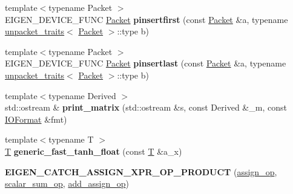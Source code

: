 \begin{DoxyCompactItemize}
\item 
\mbox{\label{namespace_eigen_1_1internal_aebd31b046fae40c8d457545c4f83875e}} 
{\footnotesize template$<$typename Packet $>$ }\\E\+I\+G\+E\+N\+\_\+\+D\+E\+V\+I\+C\+E\+\_\+\+F\+U\+NC \hyperlink{union_eigen_1_1internal_1_1_packet}{Packet} {\bfseries pinsertfirst} (const \hyperlink{union_eigen_1_1internal_1_1_packet}{Packet} \&a, typename \hyperlink{struct_eigen_1_1internal_1_1unpacket__traits}{unpacket\+\_\+traits}$<$ \hyperlink{union_eigen_1_1internal_1_1_packet}{Packet} $>$\+::type b)
\item 
\mbox{\label{namespace_eigen_1_1internal_a9925e0fa1f686d4304a8dcd1c3cc015a}} 
{\footnotesize template$<$typename Packet $>$ }\\E\+I\+G\+E\+N\+\_\+\+D\+E\+V\+I\+C\+E\+\_\+\+F\+U\+NC \hyperlink{union_eigen_1_1internal_1_1_packet}{Packet} {\bfseries pinsertlast} (const \hyperlink{union_eigen_1_1internal_1_1_packet}{Packet} \&a, typename \hyperlink{struct_eigen_1_1internal_1_1unpacket__traits}{unpacket\+\_\+traits}$<$ \hyperlink{union_eigen_1_1internal_1_1_packet}{Packet} $>$\+::type b)
\item 
\mbox{\label{namespace_eigen_1_1internal_ab2f70c62aa6708bda65f2ce9d49929e0}} 
{\footnotesize template$<$typename Derived $>$ }\\std\+::ostream \& {\bfseries print\+\_\+matrix} (std\+::ostream \&s, const Derived \&\+\_\+m, const \hyperlink{group___core___module_struct_eigen_1_1_i_o_format}{I\+O\+Format} \&fmt)
\item 
\mbox{\label{namespace_eigen_1_1internal_ab589c1da1f207b3493c463c5f006c8cc}} 
{\footnotesize template$<$typename T $>$ }\\\hyperlink{group___sparse_core___module}{T} {\bfseries generic\+\_\+fast\+\_\+tanh\+\_\+float} (const \hyperlink{group___sparse_core___module}{T} \&a\+\_\+x)
\item 
\mbox{\label{namespace_eigen_1_1internal_a3c575314883519001847c55ce6b6dba6}} 
{\bfseries E\+I\+G\+E\+N\+\_\+\+C\+A\+T\+C\+H\+\_\+\+A\+S\+S\+I\+G\+N\+\_\+\+X\+P\+R\+\_\+\+O\+P\+\_\+\+P\+R\+O\+D\+U\+CT} (\hyperlink{struct_eigen_1_1internal_1_1assign__op}{assign\+\_\+op}, \hyperlink{struct_eigen_1_1internal_1_1scalar__sum__op}{scalar\+\_\+sum\+\_\+op}, \hyperlink{struct_eigen_1_1internal_1_1add__assign__op}{add\+\_\+assign\+\_\+op})

\end{DoxyCompactItemize}
